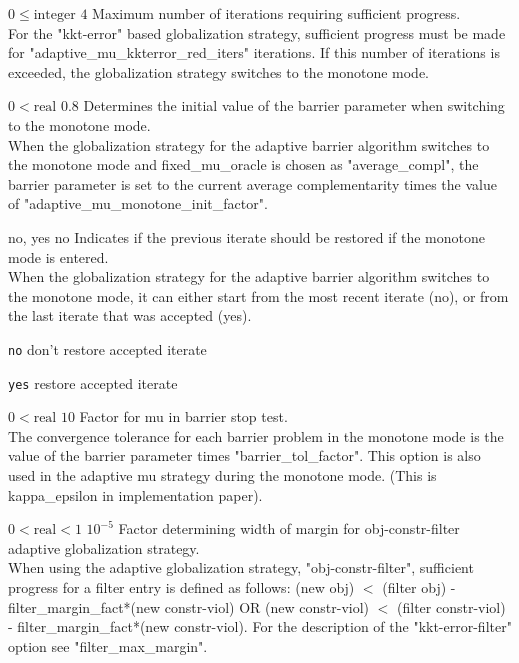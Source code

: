 %
{$0\leq\textrm{integer}$}%
{$4$}%
{Maximum number of iterations requiring sufficient progress.\\
For the "kkt-error" based globalization strategy, sufficient progress must be made for "adaptive\_mu\_kkterror\_red\_iters" iterations. If this number of iterations is exceeded, the globalization strategy switches to the monotone mode.}%
{}

%
{$0<\textrm{real}$}%
{$0.8$}%
{Determines the initial value of the barrier parameter when switching to the monotone mode.\\
When the globalization strategy for the adaptive barrier algorithm switches to the monotone mode and fixed\_mu\_oracle is chosen as "average\_compl", the barrier parameter is set to the current average complementarity times the value of "adaptive\_mu\_monotone\_init\_factor".}%
{}

%
{no, yes}%
{no}%
{Indicates if the previous iterate should be restored if the monotone mode is entered.\\
When the globalization strategy for the adaptive barrier algorithm switches to the monotone mode, it can either start from the most recent iterate (no), or from the last iterate that was accepted (yes).}%
{\begin{list}{}{
\setlength{\parsep}{0em}
\setlength{\leftmargin}{5ex}
\setlength{\labelwidth}{2ex}
\setlength{\itemindent}{0ex}
\setlength{\topsep}{0pt}}
\item[\texttt{no}] don't restore accepted iterate
\item[\texttt{yes}] restore accepted iterate
\end{list}
}

%
{$0<\textrm{real}$}%
{$10$}%
{Factor for mu in barrier stop test.\\
The convergence tolerance for each barrier problem in the monotone mode is the value of the barrier parameter times "barrier\_tol\_factor". This option is also used in the adaptive mu strategy during the monotone mode. (This is kappa\_epsilon in implementation paper).}%
{}

%
{$0<\textrm{real}<1$}%
{$10^{- 5}$}%
{Factor determining width of margin for obj-constr-filter adaptive globalization strategy.\\
When using the adaptive globalization strategy, "obj-constr-filter", sufficient progress for a filter entry is defined as follows: (new obj) $<$ (filter obj) - filter\_margin\_fact*(new constr-viol) OR (new constr-viol) $<$ (filter constr-viol) - filter\_margin\_fact*(new constr-viol).  For the description of the "kkt-error-filter" option see "filter\_max\_margin".}%
{}

